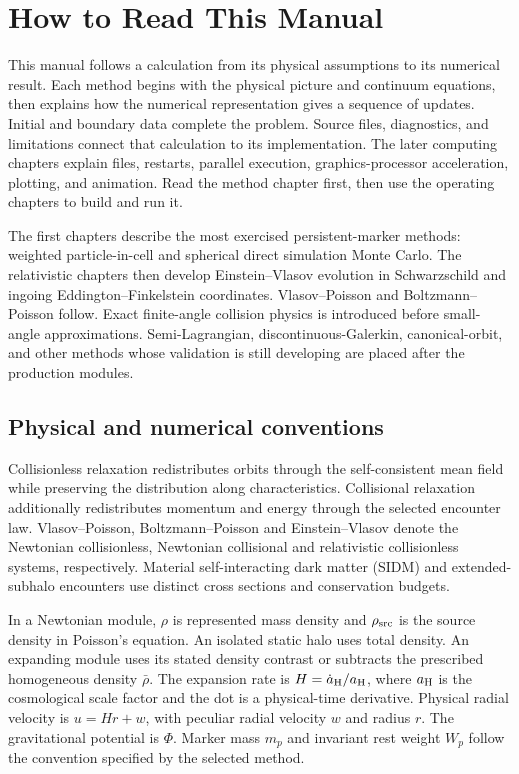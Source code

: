 \section{How to Read This Manual}

This manual follows a calculation from its physical assumptions to its
numerical result. Each method begins with the physical picture and continuum
equations, then explains how the numerical representation gives a sequence
of updates. Initial and boundary data complete the problem. Source files,
diagnostics, and limitations connect that calculation to its implementation.
The later computing chapters explain files, restarts, parallel execution,
graphics-processor acceleration, plotting, and animation. Read the method
chapter first, then use the operating chapters to build and run it.

The first chapters describe the most exercised persistent-marker methods:
weighted particle-in-cell and spherical direct simulation Monte Carlo.  The
relativistic chapters then develop Einstein--Vlasov evolution in Schwarzschild
and ingoing Eddington--Finkelstein coordinates.  Vlasov--Poisson and
Boltzmann--Poisson follow.  Exact finite-angle collision physics is introduced
before small-angle approximations.  Semi-Lagrangian, discontinuous-Galerkin,
canonical-orbit, and other methods whose validation is still developing are
placed after the production modules.

\subsection{Physical and numerical conventions}

Collisionless relaxation redistributes orbits through the self-consistent
mean field while preserving the distribution along characteristics.
Collisional relaxation additionally redistributes momentum and energy through
the selected encounter law. Vlasov--Poisson, Boltzmann--Poisson and
Einstein--Vlasov denote the Newtonian collisionless, Newtonian collisional
and relativistic collisionless systems, respectively. Material
self-interacting dark matter (SIDM) and extended-subhalo encounters use
distinct cross sections and conservation budgets.

In a Newtonian module, \(\rho\) is represented mass density and
\(\rho_{\rm src}\) is the source density in Poisson's equation.
An isolated static halo uses total density. An expanding module uses its
stated density contrast or subtracts the prescribed homogeneous density
\(\bar\rho\). The expansion rate is \(H=\dot a_{\rm H}/a_{\rm H}\), where
\(a_{\rm H}\) is the cosmological scale factor and the dot is a physical-time
derivative. Physical radial velocity is \(u=Hr+w\), with peculiar radial
velocity \(w\) and radius \(r\). The gravitational potential is \(\Phi\).
Marker mass \(m_p\) and invariant rest weight \(W_p\) follow the convention
specified by the selected method.

